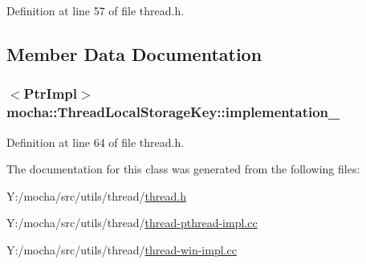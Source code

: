 Definition at line 57 of file thread.h.



\subsection{Member Data Documentation}
\hypertarget{classmocha_1_1_thread_local_storage_key_ae0fd5c5d19e230f749241ba7d58a1198}{
\subsubsection[{implementation\_\-}]{$<${\bf PtrImpl}$>$ {\bf mocha::ThreadLocalStorageKey::implementation\_\-}}}
\label{classmocha_1_1_thread_local_storage_key_ae0fd5c5d19e230f749241ba7d58a1198}


Definition at line 64 of file thread.h.



The documentation for this class was generated from the following files:\begin{DoxyCompactItemize}
\item 
Y:/mocha/src/utils/thread/\hyperlink{thread_8h}{thread.h}\item 
Y:/mocha/src/utils/thread/\hyperlink{thread-pthread-impl_8cc}{thread-\/pthread-\/impl.cc}\item 
Y:/mocha/src/utils/thread/\hyperlink{thread-win-impl_8cc}{thread-\/win-\/impl.cc}\end{DoxyCompactItemize}
